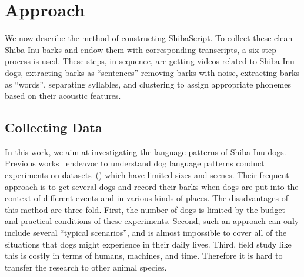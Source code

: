 \section{Approach}
\label{sec:approach}
 We now describe the method of constructing ShibaScript. To collect these clean Shiba Inu barks and endow them with corresponding transcripts, a six-step process is used.
 These steps, in sequence, are  getting videos related to Shiba Inu dogs, extracting barks as ``sentences'' 
 removing barks with noise, extracting barks as ``words'', separating syllables, and clustering to assign appropriate phonemes based on their acoustic features.

 \subsection{Collecting Data}
 \label{sec:obtrainingshibainuvideos}

In this work, we aim at investigating the language patterns of Shiba Inu dogs. Previous works~\cite{ide2021rescue, ehsani2018let,molnar2008classification, hantke2018my} endeavor to understand dog language patterns conduct experiments on datasets~() which have limited sizes and scenes.
Their frequent approach is to get several dogs and record their barks when dogs are put into the context of different events and in various kinds of places. The disadvantages of this method are three-fold. 
First, the number of dogs is limited by the budget and practical conditions of these experiments. Second, such an approach can only include several ``typical scenarios'', and is almost impossible to cover all of the situations that dogs might experience in their daily lives. Third, field study like this is costly in terms of humans, machines, and time. Therefore it is hard to transfer the research to other animal species.

